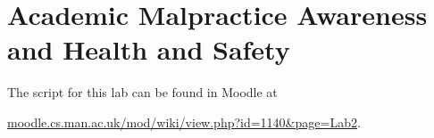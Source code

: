 \chapter{Academic Malpractice Awareness and Health and Safety}




The script for this lab can be found in Moodle at

\begin{ttoutenv}
\href{http://moodle.cs.man.ac.uk/mod/wiki/view.php?id=1140&page=Lab2}{moodle.cs.man.ac.uk/mod/wiki/view.php?id=1140\&page=Lab2}.  
\end{ttoutenv}


